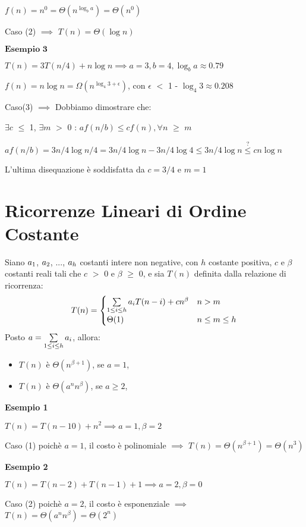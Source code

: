 \documentclass[../cheatSheetAlgoritmi.tex]{subfiles}
\begin{document}
$f(n) = n^{0} = \Theta(n^{\log_{b}{a}}) =  \Theta(n^{0})$

Caso (2) $\implies$ $T(n) = \Theta(\log{n})$

\bigskip

$\textbf{Esempio 3}$

$T(n) = 3T(n/4) + n\log{n} \implies a = 3, b = 4, \log_{b}{a} \approx 0.79$

$f(n) = n\log{n} = \Omega(n^{\log_{4}{3} + \epsilon})$, con $\epsilon$ $<$ 1 - $\log_{4}{3} \approx 0.208$

\bigskip

Caso(3) $\implies$ Dobbiamo dimostrare che:

$\exists c$ $\leq$ 1, $\exists m$ $>$ 0 : $af(n/b) \leq cf(n), \forall n$ $\geq$ $m$

$af(n/b) = 3n/4\log{n/4} = 3n/4\log{n} - 3n/4\log{4} \leq 3n/4\log{n} \stackrel{?}{\leq} cn\log{n}$

L'ultima disequazione è soddisfatta da $c = 3/4$ e $m = 1$

\section{Ricorrenze Lineari di Ordine Costante}
Siano $a\textsubscript{$1$}$, $a\textsubscript{$2$}$, $...$, $a\textsubscript{$h$}$ costanti intere non negative, con $h$ costante positiva, $c$ e $\beta$ costanti reali tali che $c$ $>$ 0 e $\beta$ $\geq$ 0, e sia $T(n)$ definita dalla relazione di ricorrenza:
	\begin{equation*}
  		T(n)=\begin{cases}
     		\sum\limits_{1 \leq i \leq h} {a \textsubscript{$i$} T(n-i)} + cn^{\beta} & \text{$n > m$}\\
    		\Theta(1) & \text{$n \leq m \leq h$}
  		\end{cases}
	\end{equation*}
Posto $a = \sum\limits_{1 \leq i \leq h} {a \textsubscript{$i$}}$, allora: 
\begin{itemize}
	\item $T(n)$ è $\Theta(n^{\beta+1})$, se $a = 1$,
	\item $T(n)$ è $\Theta(a^{n}n^{\beta})$, se $a \geq 2$,
\end{itemize}
\textbf{Esempio 1}

$T(n) = T(n - 10) + n^{2} \implies a = 1, \beta = 2$

Caso (1) poichè $a = 1$, il costo è polinomiale $\implies$ $T(n) = \Theta(n^{\beta+1}) = \Theta(n^{3})$

\bigskip

\textbf{Esempio 2}

$T(n) = T(n - 2) +  T(n - 1) + 1 \implies a = 2, \beta = 0$

Caso (2) poichè $a = 2$, il costo è esponenziale $\implies$ $T(n) = \Theta(a^{n}n^{\beta}) = \Theta(2^n)$
\newpage
\end{document}
